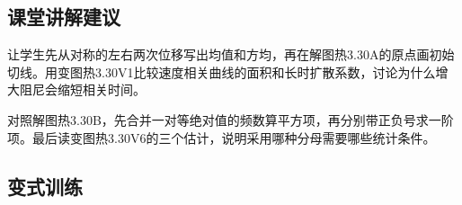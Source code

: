\documentclass[UTF8,fontset=fandol,a4paper,11pt]{ctexart}
\begin{document}


\subsection*{课堂讲解建议}

让学生先从对称的左右两次位移写出均值和方均，再在解图热3.30A的原点画初始切线。用变图热3.30V1比较速度相关曲线的面积和长时扩散系数，讨论为什么增大阻尼会缩短相关时间。

对照解图热3.30B，先合并一对等绝对值的频数算平方项，再分别带正负号求一阶项。最后读变图热3.30V6的三个估计，说明采用哪种分母需要哪些统计条件。



\subsection*{变式训练}
\end{document}
